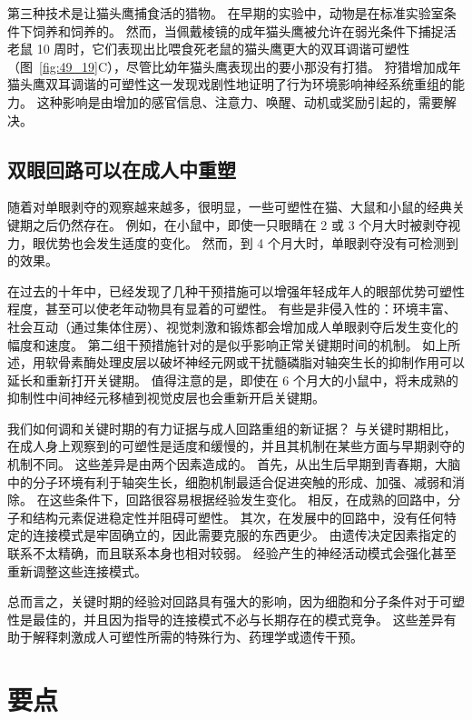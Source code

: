 第三种技术是让猫头鹰捕食活的猎物。
在早期的实验中，动物是在标准实验室条件下饲养和饲养的。
然而，当佩戴棱镜的成年猫头鹰被允许在弱光条件下捕捉活老鼠 10 周时，它们表现出比喂食死老鼠的猫头鹰更大的双耳调谐可塑性（图~\ref{fig:49_19}C），尽管比幼年猫头鹰表现出的要小那没有打猎。
狩猎增加成年猫头鹰双耳调谐的可塑性这一发现戏剧性地证明了行为环境影响神经系统重组的能力。
这种影响是由增加的感官信息、注意力、唤醒、动机或奖励引起的，需要解决。



\subsection{双眼回路可以在成人中重塑}

随着对单眼剥夺的观察越来越多，很明显，一些可塑性在猫、大鼠和小鼠的经典关键期之后仍然存在。
例如，在小鼠中，即使一只眼睛在 2 或 3 个月大时被剥夺视力，眼优势也会发生适度的变化。
然而，到 4 个月大时，单眼剥夺没有可检测到的效果。


在过去的十年中，已经发现了几种干预措施可以增强年轻成年人的眼部优势可塑性程度，甚至可以使老年动物具有显着的可塑性。
有些是非侵入性的：环境丰富、社会互动（通过集体住房）、视觉刺激和锻炼都会增加成人单眼剥夺后发生变化的幅度和速度。
第二组干预措施针对的是似乎影响正常关键期时间的机制。
如上所述，用软骨素酶处理皮层以破坏神经元网或干扰髓磷脂对轴突生长的抑制作用可以延长和重新打开关键期。
值得注意的是，即使在 6 个月大的小鼠中，将未成熟的抑制性中间神经元移植到视觉皮层也会重新开启关键期。


我们如何调和关键时期的有力证据与成人回路重组的新证据？
与关键时期相比，在成人身上观察到的可塑性是适度和缓慢的，并且其机制在某些方面与早期剥夺的机制不同。
这些差异是由两个因素造成的。
首先，从出生后早期到青春期，大脑中的分子环境有利于轴突生长，细胞机制最适合促进突触的形成、加强、减弱和消除。
在这些条件下，回路很容易根据经验发生变化。
相反，在成熟的回路中，分子和结构元素促进稳定性并阻碍可塑性。
其次，在发展中的回路中，没有任何特定的连接模式是牢固确立的，因此需要克服的东西更少。
由遗传决定因素指定的联系不太精确，而且联系本身也相对较弱。
经验产生的神经活动模式会强化甚至重新调整这些连接模式。


总而言之，关键时期的经验对回路具有强大的影响，因为细胞和分子条件对于可塑性是最佳的，并且因为指导的连接模式不必与长期存在的模式竞争。
这些差异有助于解释刺激成人可塑性所需的特殊行为、药理学或遗传干预。



\section{要点}

